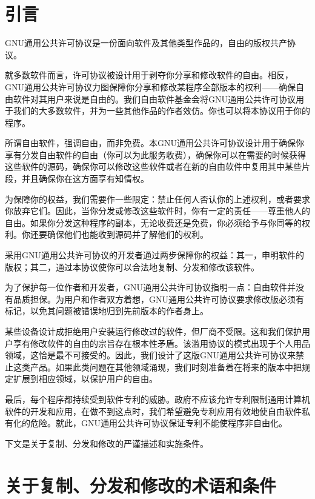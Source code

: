 \section{引言}
GNU通用公共许可协议是一份面向软件及其他类型作品的，自由的版权共产协议。\par
就多数软件而言，许可协议被设计用于剥夺你分享和修改软件的自由。相反，GNU通用公共许可协议力图保障你分享和修改某程序全部版本的权利——确保自由软件对其用户来说是自由的。我们自由软件基金会将GNU通用公共许可协议用于我们的大多数软件，并为一些其他作品的作者效仿。你也可以将本协议用于你的程序。\par
所谓自由软件，强调自由，而非免费。本GNU通用公共许可协议设计用于确保你享有分发自由软件的自由（你可以为此服务收费），确保你可以在需要的时候获得这些软件的源码，确保你可以修改这些软件或者在新的自由软件中复用其中某些片段，并且确保你在这方面享有知情权。\par
为保障你的权益，我们需要作一些限定：禁止任何人否认你的上述权利，或者要求你放弃它们。因此，当你分发或修改这些软件时，你有一定的责任——尊重他人的自由。如果你分发这种程序的副本，无论收费还是免费，你必须给予与你同等的权利。你还要确保他们也能收到源码并了解他们的权利。\par
采用GNU通用公共许可协议的开发者通过两步保障你的权益：其一，申明软件的版权；其二，通过本协议使你可以合法地复制、分发和修改该软件。\par
为了保护每一位作者和开发者，GNU通用公共许可协议指明一点：自由软件并没有品质担保。为用户和作者双方着想，GNU通用公共许可协议要求修改版必须有标记，以免其问题被错误地归到先前版本的作者身上。\par
某些设备设计成拒绝用户安装运行修改过的软件，但厂商不受限。这和我们保护用户享有修改软件的自由的宗旨存在根本性矛盾。该滥用协议的模式出现于个人用品领域，这恰是最不可接受的。因此，我们设计了这版GNU通用公共许可协议来禁止这类产品。如果此类问题在其他领域涌现，我们时刻准备着在将来的版本中把规定扩展到相应领域，以保护用户的自由。\par
最后，每个程序都持续受到软件专利的威胁。政府不应该允许专利限制通用计算机软件的开发和应用，在做不到这点时，我们希望避免专利应用有效地使自由软件私有化的危险。就此，GNU通用公共许可协议保证专利不能使程序非自由化。\par
下文是关于复制、分发和修改的严谨描述和实施条件。
\section{关于复制、分发和修改的术语和条件}
